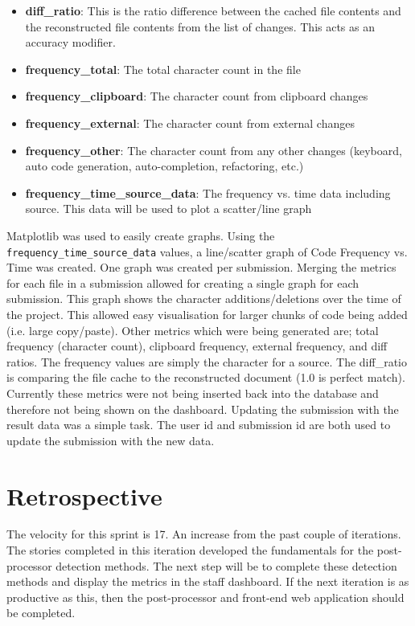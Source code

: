 \begin{itemize}
\item \textbf{diff\_ratio}: This is the ratio difference between the cached file contents and the reconstructed file contents from the list of changes. This acts as an accuracy modifier.
\item \textbf{frequency\_total}: The total character count in the file
\item \textbf{frequency\_clipboard}: The character count from clipboard changes
\item \textbf{frequency\_external}: The character count from external changes
\item \textbf{frequency\_other}: The character count from any other changes (keyboard, auto code generation, auto-completion, refactoring, etc.)
\item \textbf{frequency\_time\_source\_data}: The frequency vs. time data including source. This data will be used to plot a scatter/line graph
\end{itemize}

Matplotlib was used to easily create graphs. Using the \texttt{frequency\_time\_source\_data} values, a line/scatter graph of Code Frequency vs. Time was created. One graph was created per submission. Merging the metrics for each file in a submission allowed for creating a single graph for each submission. This graph shows the character additions/deletions over the time of the project. This allowed easy visualisation for larger chunks of code being added (i.e. large copy/paste). Other metrics which were being generated are; total frequency (character count), clipboard frequency, external frequency, and diff ratios. The frequency values are simply the character for a source. The diff\_ratio is comparing the file cache to the reconstructed document (1.0 is perfect match). Currently these metrics were not being inserted back into the database and therefore not being shown on the dashboard. Updating the submission with the result data was a simple task. The user id and submission id are both used to update the submission with the new data.

\section{Retrospective}
The velocity for this sprint is 17. An increase from the past couple of iterations. The stories completed in this iteration developed the fundamentals for the post-processor detection methods. The next step will be to complete these detection methods and display the metrics in the staff dashboard. If the next iteration is as productive as this, then the post-processor and front-end web application should be completed.

